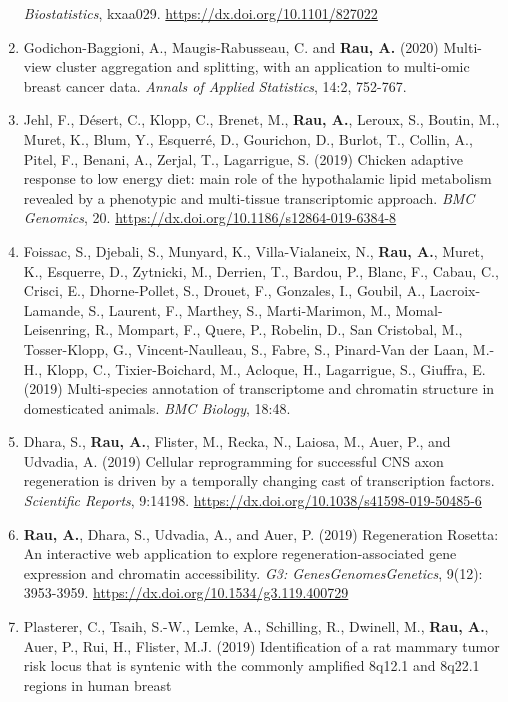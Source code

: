 \documentclass[11pt, a4paper]{awesome-cv}
\begin{document}
\begin{enumerate}
  \emph{Biostatistics}, kxaa029. \url{https://dx.doi.org/10.1101/827022}
\item
  Godichon-Baggioni, A., Maugis-Rabusseau, C. and \textbf{Rau, A.}
  (2020) Multi-view cluster aggregation and splitting, with an
  application to multi-omic breast cancer data. \emph{Annals of Applied
  Statistics}, 14:2, 752-767.
\item
  Jehl, F., Désert, C., Klopp, C., Brenet, M., \textbf{Rau, A.}, Leroux,
  S., Boutin, M., Muret, K., Blum, Y., Esquerré, D., Gourichon, D.,
  Burlot, T., Collin, A., Pitel, F., Benani, A., Zerjal, T., Lagarrigue,
  S. (2019) Chicken adaptive response to low energy diet: main role of
  the hypothalamic lipid metabolism revealed by a phenotypic and
  multi-tissue transcriptomic approach. \emph{BMC Genomics}, 20.
  \url{https://dx.doi.org/10.1186/s12864-019-6384-8}
\item
  Foissac, S., Djebali, S., Munyard, K., Villa-Vialaneix, N.,
  \textbf{Rau, A.}, Muret, K., Esquerre, D., Zytnicki, M., Derrien, T.,
  Bardou, P., Blanc, F., Cabau, C., Crisci, E., Dhorne-Pollet, S.,
  Drouet, F., Gonzales, I., Goubil, A., Lacroix-Lamande, S., Laurent,
  F., Marthey, S., Marti-Marimon, M., Momal-Leisenring, R., Mompart, F.,
  Quere, P., Robelin, D., San Cristobal, M., Tosser-Klopp, G.,
  Vincent-Naulleau, S., Fabre, S., Pinard-Van der Laan, M.-H., Klopp,
  C., Tixier-Boichard, M., Acloque, H., Lagarrigue, S., Giuffra, E.
  (2019) Multi-species annotation of transcriptome and chromatin
  structure in domesticated animals. \emph{BMC Biology}, 18:48.
\item
  Dhara, S., \textbf{Rau, A.}, Flister, M., Recka, N., Laiosa, M., Auer,
  P., and Udvadia, A. (2019) Cellular reprogramming for successful CNS
  axon regeneration is driven by a temporally changing cast of
  transcription factors. \emph{Scientific Reports}, 9:14198.
  \url{https://dx.doi.org/10.1038/s41598-019-50485-6}
\item
  \textbf{Rau, A.}, Dhara, S., Udvadia, A., and Auer, P. (2019)
  Regeneration Rosetta: An interactive web application to explore
  regeneration-associated gene expression and chromatin accessibility.
  \emph{G3: Genes\textbar Genomes\textbar Genetics}, 9(12): 3953-3959.
  \url{https://dx.doi.org/10.1534/g3.119.400729}
\item
  Plasterer, C., Tsaih, S.-W., Lemke, A., Schilling, R., Dwinell, M.,
  \textbf{Rau, A.}, Auer, P., Rui, H., Flister, M.J. (2019)
  Identification of a rat mammary tumor risk locus that is syntenic with
  the commonly amplified 8q12.1 and 8q22.1 regions in human breast

\end{enumerate}
\end{document}
